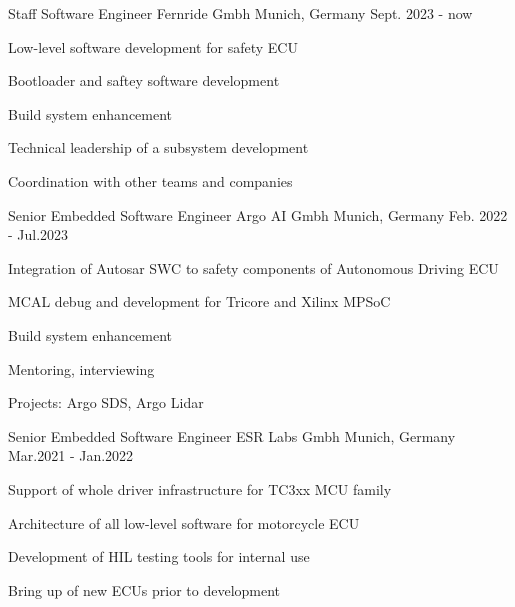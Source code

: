 


\begin{cventries}


\cventry
{Staff Software Engineer} %
{Fernride Gmbh} %
{Munich, Germany} %
{Sept. 2023 - now} %
{ %
\begin{cvitems}
\item {Low-level software development for safety ECU}
\item {Bootloader and saftey software development}
\item {Build system enhancement }
\item {Technical leadership of a subsystem development}
\item {Coordination with other teams and companies}
\end{cvitems}
}



\cventry
{Senior Embedded Software Engineer} %
{Argo AI Gmbh} %
{Munich, Germany} %
{Feb. 2022 - Jul.2023} %
{ %
\begin{cvitems}
\item {Integration of Autosar SWC to safety components of Autonomous Driving ECU}
\item {MCAL debug and development for Tricore and Xilinx MPSoC}
\item {Build system enhancement }
\item {Mentoring, interviewing}
\item {Projects: Argo SDS, Argo Lidar}
\end{cvitems}
}


\cventry
{Senior Embedded Software Engineer} %
{ESR Labs Gmbh} %
{Munich, Germany} %
{Mar.2021 - Jan.2022} %
{ %
\begin{cvitems}
\item {Support of whole driver infrastructure for TC3xx MCU family}
\item {Architecture of all low-level software for motorcycle ECU}
\item {Development of HIL testing tools for internal use}
\item {Bring up of new ECUs prior to development}
\end{cvitems}
}


\end{cventries}
